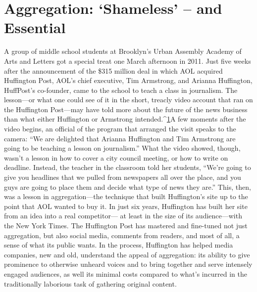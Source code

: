\chapter{Aggregation: `Shameless' – and Essential}
A group of middle school students at Brooklyn's Urban Assembly Academy
of Arts and Letters got a special treat one March afternoon in 2011. Just five
weeks after the announcement of the \$315 million deal in which AOL acquired
Huffington Post, AOL's chief executive, Tim Armstrong, and Arianna Huffington,
HuffPost's co-founder, came to the school to teach a class in journalism.
The lesson—or what one could see of it in the short, treacly video account
that ran on the Huffington Post—may have told more about the future of the
news business than what either Huffington or Armstrong intended.^{\href{#endnotes-chapter-6}{1}}A few moments
after the video begins, an official of the program that arranged the visit
speaks to the camera: ``We are delighted that Arianna Huffington and Tim Armstrong
are going to be teaching a lesson on journalism.'' What the video showed,
though, wasn't a lesson in how to cover a city council meeting, or how to write
on deadline. Instead, the teacher in the classroom told her students, ``We're going
to give you headlines that we pulled from newspapers all over the place, and you
guys are going to place them and decide what type of news they are.''
This, then, was a lesson in aggregation—the technique that built Huffington's
site up to the point that AOL wanted to buy it.
In just six years, Huffington has built her site from an idea into a real competitor—
at least in the size of its audience—with the New York Times. The Huffington
Post has mastered and fine-tuned not just aggregation, but also social media,
comments from readers, and most of all, a sense of what its public wants. In the
process, Huffington has helped media companies, new and old, understand the
appeal of aggregation: its ability to give prominence to otherwise unheard voices
and to bring together and serve intensely engaged audiences, as well its minimal
costs compared to what's incurred in the traditionally laborious task of gathering
original content.

